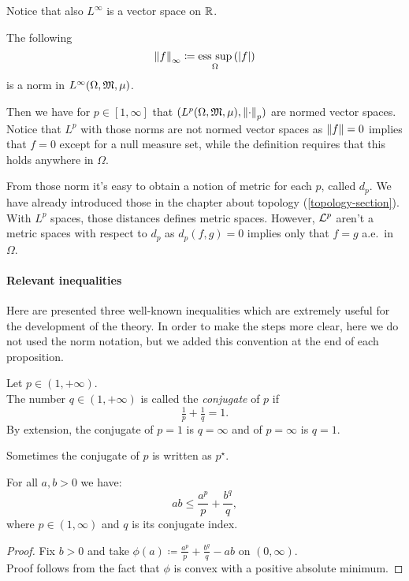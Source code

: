 Notice that also $L^\infty$ is a vector space on $\mathbb R$. 

\begin{defn}
	The following
	$$
		\left\lVert f\right\rVert_\infty
		\coloneqq \operatorname*{ess\ sup}_\Omega \left(|f|\right)
	$$ 
	is a norm in $L^\infty(\Omega, \mathfrak M, \mu)$.
\end{defn}

Then we have for $p \in [1, \infty]$ that $(L^p(\Omega, \mathfrak M, \mu), \left\lVert\cdot\right\rVert_p)$ are normed vector spaces.
Notice that $L^p$ with those norms are not normed vector spaces as $\left\lVert f\right\rVert=0$ implies that $f=0$ except for a null measure set, while the definition requires that this holds anywhere in $\Omega$.

From those norm it's easy to obtain a notion of metric for each $p$, called $d_p$. We have already introduced those in the chapter about topology (\vref{topology-section}). With $L^p$ spaces, those distances defines metric spaces. However, $\mathcal L^p$ aren't a metric spaces with respect to $d_p$ as $d_p(f,g) = 0$ implies only that $f=g$ a.e.\ in $\Omega$.


\paragraph{Relevant inequalities} Here are presented three well-known inequalities which are extremely useful for the development of the theory. In order to make the steps more clear, here we do not used the norm notation, but we added this convention at the end of each proposition.

\begin{defn}
	Let $p\in(1, +\infty)$.\\
	The number $q \in (1, +\infty)$ is called the \emph{conjugate} of $p$ if 
	$$\tfrac 1 p + \tfrac 1 q = 1.$$
	By extension, the conjugate of $p=1$ is $q=\infty$ and of $p=\infty$ is $q=1$.
\end{defn}

Sometimes the conjugate of $p$ is written as $p^\star$.

\begin{prop} \label{young-ineq}
	For all $a,b > 0$ we have:
	$$ab\leq \frac{a^p}{p} + \frac{b^q}{q},$$
	where $p \in (1, \infty)$ and $q$ is its conjugate index.
\end{prop}
\begin{proof}
	Fix $b>0$ and take $\phi(a) \coloneqq \frac{a^p}{p} + \frac{b^q}{q} - ab$ on $(0,\infty)$.\\
	Proof follows from the fact that $\phi$ is convex with a positive absolute minimum.
\end{proof}

